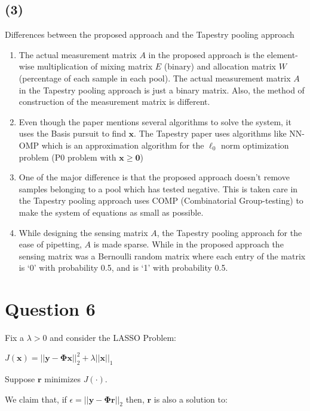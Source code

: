 \documentclass[fleqn, 11pt]{article}
\newcommand{\bs}[1]{\boldsymbol{#1}}
\begin{document}
\subsection*{(3)}
Differences between the proposed approach and the Tapestry pooling approach
\begin{enumerate}
    \item The actual measurement matrix $A$ in the proposed approach is the element-wise multiplication of mixing matrix $E$ (binary) and allocation matrix $W$ (percentage of each sample in each pool). The actual measurement matrix $A$ in the Tapestry pooling approach is just a binary matrix. Also, the method of construction of the measurement matrix is different.
    \item Even though the paper mentions several algorithms to solve the system, it uses the Basis pursuit to find $\bs{x}$. The Tapestry paper uses algorithms like NN-OMP which is an approximation algorithm for the $\ell_0$ norm optimization problem (P0 problem with $\bs{x} \ge \bs{0}$)
    \item One of the major difference is that the proposed approach doesn't remove samples belonging to a pool which has tested negative. This is taken care in the Tapestry pooling approach uses COMP (Combinatorial Group-testing) to make the system of equations as small as possible.
    \item While designing the sensing matrix $A$, the Tapestry pooling approach for the ease of pipetting, $A$ is made sparse. While in the proposed approach the sensing matrix was a Bernoulli random matrix where each entry of the matrix is `0' with probability 0.5, and is `1' with probability 0.5.
\end{enumerate}



\newpage
\section*{Question 6}
\setcounter{equation}{0}

Fix a $\lambda > 0$ and consider the LASSO Problem:

$J(\boldsymbol{x}) = || \bs{y}-\bs{\Phi} \bs{x} ||_2^2 + \lambda ||\bs{x}||_1 $

\smallskip

Suppose $\bs{r}$ minimizes $J(\cdot)$. 

\smallskip

We claim that, if $\epsilon = || \bs{y}-\bs{\Phi} \bs{r} ||_2$ 
then, $\bs{r}$ is also a solution to: 
\end{document}
